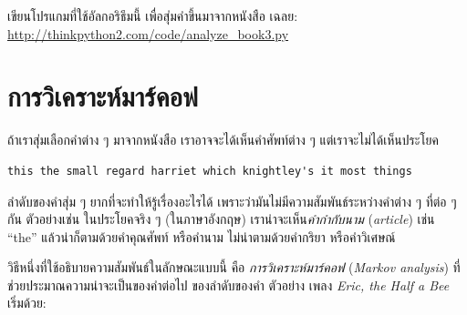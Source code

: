 \begin{exercise}
\label{randhist}


เขียนโปรแกมที่ใช้อัลกอริธึมนี้ เพื่อสุ่มคำขึ้นมาจากหนังสือ  
เฉลย:
\url{http://thinkpython2.com/code/analyze_book3.py}

\end{exercise}



\section{การวิเคราะห์มาร์คอฟ}
\label{markov}


ถ้าเราสุ่มเลือกคำต่าง ๆ มาจากหนังสือ
เราอาจจะได้เห็นคำศัพท์ต่าง ๆ
แต่เราจะไม่ได้เห็นประโยค

\begin{verbatim}
this the small regard harriet which knightley's it most things
\end{verbatim}
%
%
ลำดับของคำสุ่ม ๆ ยากที่จะทำให้รู้เรื่องอะไรได้
เพราะว่ามันไม่มีความสัมพันธ์ระหว่างคำต่าง ๆ ที่ต่อ ๆ กัน
ตัวอย่างเช่น ในประโยคจริง ๆ (ในภาษาอังกฤษ)
เราน่าจะเห็น\textit{คำกำกับนาม} (\textit{article}) เช่น ``the''
แล้วน่าก็ตามด้วยคำคุณศัพท์ หรือคำนาม
ไม่น่าตามด้วยคำกริยา หรือคำวิเศษณ์

  
วิธีหนึ่งที่ใช้อธิบายความสัมพันธ์ในลักษณะแบบนี้ คือ \textit{การวิเคราะห์มาร์คอฟ} (\textit{Markov analysis})
ที่ช่วยประมาณความน่าจะเป็นของคำต่อไป ของลำดับของคำ
ตัวอย่าง เพลง \textit{Eric, the Half a Bee} เริ่มด้วย:

